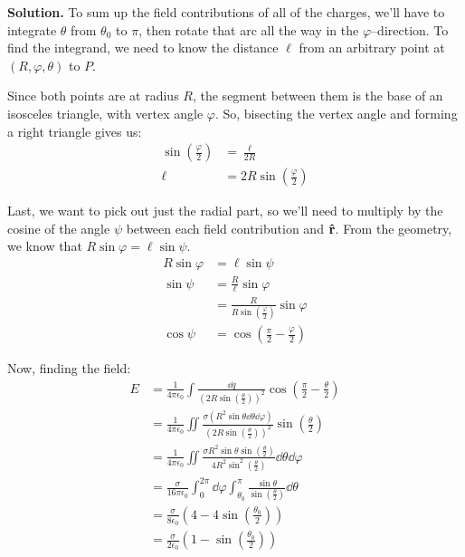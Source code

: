 \documentclass{article}
\begin{document}
\textbf{Solution.} To sum up the field contributions of all of the charges, we'll have to integrate $\theta$ from $\theta_0$ to $\pi$, then rotate that arc all the way in the $\varphi$--direction. To find the integrand, we need to know the distance $\ell$ from an arbitrary point at $(R, \varphi, \theta)$ to $P$.

Since both points are at radius $R$, the segment between them is the base of an isosceles triangle, with vertex angle $\varphi$. So, bisecting the vertex angle and forming a right triangle gives us:
\[
\begin{aligned}
	\sin\left(\frac{\varphi}{2}\right) &= \frac{\ell}{2R} \\
	\ell &= 2R\sin\left(\frac{\varphi}{2}\right)
\end{aligned}
\]


Last, we want to pick out just the radial part, so we'll need to multiply by the cosine of the angle $\psi$ between each field contribution and $\vu{\vb{r}}$. From the geometry, we know that $R\sin\varphi = \ell\sin\psi$.
\[
\begin{aligned}
	R\sin\varphi &= \ell\sin\psi \\
	\sin\psi &= \frac{R}{\ell}\sin\varphi \\
	&= \frac{R}{R\sin\left(\frac{\varphi}{2}\right)}\sin\varphi \\
	\cos\psi &= \cos\left(\frac{\pi}{2} - \frac{\varphi}{2}\right)
\end{aligned}
\]


Now, finding the field:
\[
\begin{aligned}
	E &= \frac{1}{4\pi\epsilon_0}\int \frac{\dd q}{\left(2R\sin\left(\frac{\theta}{2}\right)\right) ^2}\cos\left(\frac{\pi}{2} - \frac{\theta}{2}\right) \\
	&= \frac{1}{4\pi\epsilon_0} \iint \frac{\sigma(R^2 \sin\theta\dd{\theta}\dd{\varphi})}{\left(2R\sin\left(\frac{\theta}{2}\right)\right) ^2}\sin\left(\frac{\theta}{2}\right) \\
	&= \frac{1}{4\pi\epsilon_0} \iint \frac{\sigma R^2\sin\theta\sin\left(\frac{\theta}{2}\right)}{4R^2 \sin^2\left(\frac{\theta}{2}\right)}\dd{\theta}\dd{\varphi} \\
	&= \frac{\sigma}{16\pi\epsilon_0}\int_0^{2\pi}\dd{\varphi} \int_{\theta_0}^\pi \frac{\sin\theta}{\sin\left(\frac{\theta}{2}\right)}\dd{\theta} \\
	&= \frac{\sigma}{8\epsilon_0}\left(4-4\sin\left(\frac{\theta_0}{2}\right)\right) \\
	&= \frac{\sigma}{2\epsilon_0}\left(1-\sin\left(\frac{\theta_0}{2}\right)\right)
\end{aligned}
\]
\end{document}
